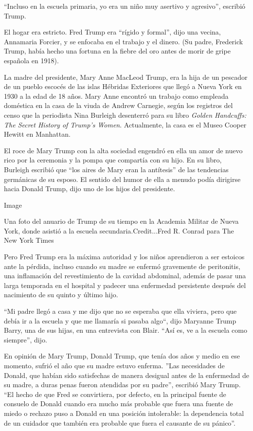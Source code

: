 ``Incluso en la escuela primaria, yo era un niño muy asertivo y
agresivo'', escribió Trump.

El hogar era estricto. Fred Trump era ``rígido y formal'', dijo una
vecina, Annamaria Forcier, y se enfocaba en el trabajo y el dinero. (Su
padre, Frederick Trump, había hecho una fortuna en la fiebre del oro
antes de morir de gripe española en 1918).

La madre del presidente, Mary Anne MacLeod Trump, era la hija de un
pescador de un pueblo escocés de las islas Hébridas Exteriores que llegó
a Nueva York en 1930 a la edad de 18 años. Mary Anne encontró un trabajo
como empleada doméstica en la casa de la viuda de Andrew Carnegie, según
los registros del censo que la periodista Nina Burleigh desenterró para
su libro \emph{Golden Handcuffs: The Secret History of Trump's Women}.
Actualmente, la casa es el Museo Cooper Hewitt en Manhattan.

El roce de Mary Trump con la alta sociedad engendró en ella un amor de
nuevo rico por la ceremonia y la pompa que compartía con su hijo. En su
libro, Burleigh escribió que ``los aires de Mary eran la antítesis'' de
las tendencias germánicas de su esposo. El sentido del humor de ella a
menudo podía dirigirse hacia Donald Trump, dijo uno de los hijos del
presidente.

Image

Una foto del anuario de Trump de su tiempo en la Academia Militar de
Nueva York, donde asistió a la escuela secundaria.Credit...Fred R.
Conrad para The New York Times

Pero Fred Trump era la máxima autoridad y los niños aprendieron a ser
estoicos ante la pérdida, incluso cuando su madre se enfermó gravemente
de peritonitis, una inflamación del revestimiento de la cavidad
abdominal, además de pasar una larga temporada en el hospital y padecer
una enfermedad persistente después del nacimiento de su quinto y último
hijo.

``Mi padre llegó a casa y me dijo que no se esperaba que ella viviera,
pero que debía ir a la escuela y que me llamaría si pasaba algo``, dijo
Maryanne Trump Barry, una de sus hijas, en una entrevista con Blair.
``Así es, ve a la escuela como siempre'', dijo.

En opinión de Mary Trump, Donald Trump, que tenía dos años y medio en
ese momento, sufrió el año que su madre estuvo enferma. ''Las
necesidades de Donald, que habían sido satisfechas de manera desigual
antes de la enfermedad de su madre, a duras penas fueron atendidas por
su padre'', escribió Mary Trump. ``El hecho de que Fred se convirtiera,
por defecto, en la principal fuente de consuelo de Donald cuando era
mucho más probable que fuera una fuente de miedo o rechazo puso a Donald
en una posición intolerable: la dependencia total de un cuidador que
también era probable que fuera el causante de su pánico''.

